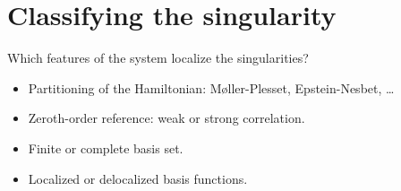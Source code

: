 \documentclass[xcolor=x11names,compress]{beamer}
\renewcommand{\(}{\begin{columns}}
\renewcommand{\)}{\end{columns}}
\newcommand{\<}[1]{\begin{column}{#1}}
\renewcommand{\>}{\end{column}}
\begin{document}
\section{Classifying the singularity}

\begin{frame}{Which features of the system localize the singularities?}

\begin{itemize}
    \item Partitioning of the Hamiltonian: Møller-Plesset, Epstein-Nesbet, \ldots
    \item Zeroth-order reference: weak or strong correlation.
    \item Finite or complete basis set.
    \item Localized or delocalized basis functions.
\end{itemize}
    
\end{frame}
\end{document}
